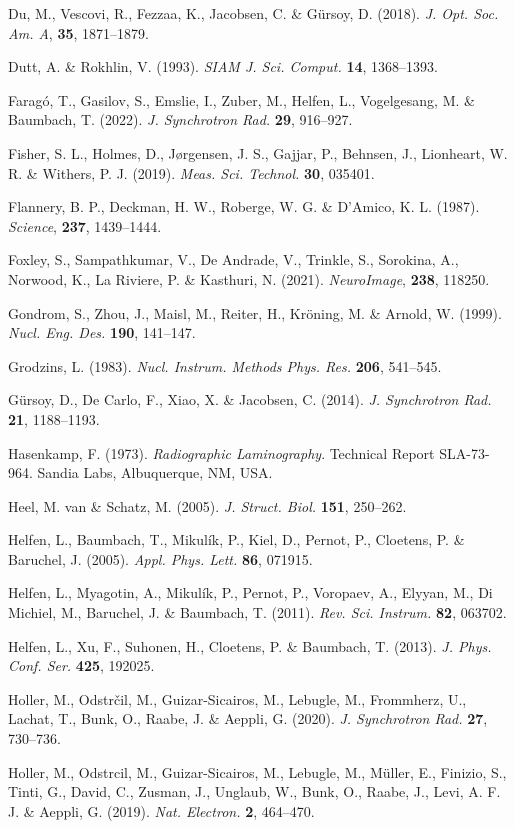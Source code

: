 \documentclass{article}
\begin{document}
\begin{hangpars}
Du, M., Vescovi, R., Fezzaa, K., Jacobsen, C. \& Gürsoy, D. (2018). \emph{J. Opt. Soc. Am. A}, \textbf{35}, 1871–1879.

Dutt, A. \& Rokhlin, V. (1993). \emph{SIAM J. Sci. Comput.} \textbf{14}, 1368–1393.

Faragó, T., Gasilov, S., Emslie, I., Zuber, M., Helfen, L., Vogelgesang, M. \& Baumbach, T. (2022). \emph{J. Synchrotron Rad.} \textbf{29}, 916–927.

Fisher, S. L., Holmes, D., Jørgensen, J. S., Gajjar, P., Behnsen, J., Lionheart, W. R. \& Withers, P. J. (2019). \emph{Meas. Sci. Technol.} \textbf{30}, 035401.

Flannery, B. P., Deckman, H. W., Roberge, W. G. \& D’Amico, K. L. (1987). \emph{Science}, \textbf{237}, 1439–1444.

Foxley, S., Sampathkumar, V., De Andrade, V., Trinkle, S., Sorokina, A., Norwood, K., La Riviere, P. \& Kasthuri, N. (2021). \emph{NeuroImage}, \textbf{238}, 118250.

Gondrom, S., Zhou, J., Maisl, M., Reiter, H., Kröning, M. \& Arnold, W. (1999). \emph{Nucl. Eng. Des.} \textbf{190}, 141–147.

Grodzins, L. (1983). \emph{Nucl. Instrum. Methods Phys. Res.} \textbf{206}, 541–545.

Gürsoy, D., De Carlo, F., Xiao, X. \& Jacobsen, C. (2014). \emph{J. Synchrotron Rad.} \textbf{21}, 1188–1193.

Hasenkamp, F. (1973). \emph{Radiographic Laminography}. Technical Report SLA-73-964. Sandia Labs, Albuquerque, NM, USA.

Heel, M. van \& Schatz, M. (2005). \emph{J. Struct. Biol.} \textbf{151}, 250–262.

Helfen, L., Baumbach, T., Mikulík, P., Kiel, D., Pernot, P., Cloetens, P. \& Baruchel, J. (2005). \emph{Appl. Phys. Lett.} \textbf{86}, 071915.

Helfen, L., Myagotin, A., Mikulík, P., Pernot, P., Voropaev, A., Elyyan, M., Di Michiel, M., Baruchel, J. \& Baumbach, T. (2011). \emph{Rev. Sci. Instrum.} \textbf{82}, 063702.

Helfen, L., Xu, F., Suhonen, H., Cloetens, P. \& Baumbach, T. (2013). \emph{J. Phys. Conf. Ser.} \textbf{425}, 192025.

Holler, M., Odstrčil, M., Guizar-Sicairos, M., Lebugle, M., Frommherz, U., Lachat, T., Bunk, O., Raabe, J. \& Aeppli, G. (2020). \emph{J. Synchrotron Rad.} \textbf{27}, 730–736.

Holler, M., Odstrcil, M., Guizar-Sicairos, M., Lebugle, M., Müller, E., Finizio, S., Tinti, G., David, C., Zusman, J., Unglaub, W., Bunk, O., Raabe, J., Levi, A. F. J. \& Aeppli, G. (2019). \emph{Nat. Electron.} \textbf{2}, 464–470.


\end{hangpars}
\end{document}
